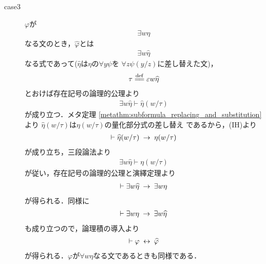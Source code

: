 \begin{sketch}
\begin{description}
\begin{description}
				\item[case3] $\varphi$が
					\begin{align}
						\exists w \eta
					\end{align}
					なる文のとき，$\widehat{\varphi}$とは
					\begin{align}
						\exists w \widehat{\eta}
					\end{align}
					なる式であって($\widehat{\eta}$は$\eta$の$\forall y \psi$を
					$\forall z \psi(y/z)$に差し替えた文)，
					\begin{align}
						\tau \defeq \varepsilon w \widehat{\eta}
					\end{align}
					とおけば存在記号の論理的公理より
					\begin{align}
						\exists w \widehat{\eta} \vdash \widehat{\eta}(w/\tau)
					\end{align}
					が成り立つ．メタ定理
					\ref{metathm:subformula_replacing_and_substitution}より
					$\widehat{\eta}(w/\tau)$は$\eta(w/\tau)$の量化部分式の差し替え
					であるから，(IH)より
					\begin{align}
						\vdash \widehat{\eta}(w/\tau) \hspace{0.25em}\rightarrow\hspace{0.25em} \eta(w/\tau)
					\end{align}
					が成り立ち，三段論法より
					\begin{align}
						\exists w \widehat{\eta} \vdash \eta(w/\tau)
					\end{align}
					が従い，存在記号の論理的公理と演繹定理より
					\begin{align}
						\vdash \exists w \widehat{\eta} \hspace{0.25em}\rightarrow\hspace{0.25em} \exists w \eta
					\end{align}
					が得られる．同様に
					\begin{align}
						\vdash \exists w \eta \hspace{0.25em}\rightarrow\hspace{0.25em} \exists w \widehat{\eta}
					\end{align}
					も成り立つので，論理積の導入より
					\begin{align}
						\vdash \varphi \hspace{0.25em}\leftrightarrow\hspace{0.25em} \widehat{\varphi}
					\end{align}
					が得られる．$\varphi$が$\forall w \eta$なる文であるときも同様である．
					\QED

\end{description}
\end{description}
\end{sketch}
